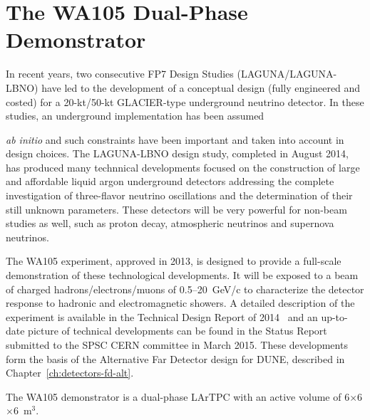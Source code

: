 \section{The WA105 Dual-Phase Demonstrator}
\label{sec:proto-cern-double}

In recent years, two consecutive FP7 Design Studies
(LAGUNA/LAGUNA-LBNO) have led to the development of a conceptual
design (fully engineered and costed) for a 20-kt/50-kt GLACIER-type
underground neutrino detector. In these studies, an underground
implementation has been assumed {\textit{ab initio} 
and such constraints have been important and taken into account in
design choices. The LAGUNA-LBNO design study, completed in August
2014, has produced many technnical developments focused on the
construction of large and affordable liquid argon underground
detectors addressing the complete investigation of three-flavor
neutrino oscillations and the determination of their still unknown
parameters.
%
These detectors will be very powerful for non-beam studies as well,
such as proton decay, atmospheric neutrinos and supernova neutrinos.

The WA105 experiment, approved in 2013, is designed to provide a full-scale demonstration
of these technological developments. It will be exposed to a beam of
charged hadrons/electrons/muons of 0.5--20~GeV/c to characterize the
detector response to hadronic and electromagnetic showers.  A detailed
description of the experiment is available in the Technical Design
Report of 2014~\cite{WA105_TDR} and an up-to-date picture of
technical developments can be found in the Status Report\cite{WA105_SREP}
submitted to the SPSC CERN committee in March
2015. These developments form the basis of the
Alternative Far Detector design for DUNE, described in
Chapter~\ref{ch:detectors-fd-alt}.


The WA105 demonstrator is a dual-phase LArTPC with an active volume of
6$\times$6$\times$6~m$^3$.

}
